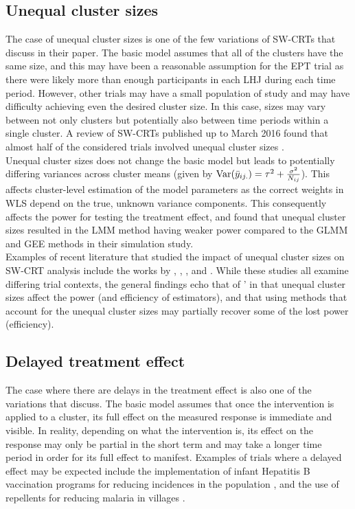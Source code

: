 \documentclass[10pt]{article}
\begin{document}
\subsection{Unequal cluster sizes}

The case of unequal cluster sizes is one of the few variations of SW-CRTs that \citeauthor{Hussey:2007} discuss in their paper. The basic model assumes that all of the clusters have the same size, and this may have been a reasonable assumption for the EPT trial as there were likely more than enough participants in each LHJ during each time period. However, other trials may have a small population of study and may have difficulty achieving even the desired cluster size. In this case, sizes may vary between not only clusters but potentially also between time periods within a single cluster. A review of SW-CRTs published up to March 2016 found that almost half of the considered trials involved unequal cluster sizes \parencite{Kristunas:2017}.
\\

Unequal cluster sizes does not change the basic model but leads to potentially differing variances across cluster means (given by $\mathrm{Var}(\bar{y}_{ij.})=\tau^2+\frac{\sigma^2}{N_{ij}}$). This affects cluster-level estimation of the model parameters as the correct weights in WLS depend on the true, unknown variance components. This consequently affects the power for testing the treatment effect, and \textcite{Hussey:2007} found that unequal cluster sizes resulted in the LMM method having weaker power compared to the GLMM and GEE methods in their simulation study.
\\

Examples of recent literature that studied the impact of unequal cluster sizes on SW-CRT analysis include the works by \textcite{Martin:2019}, \textcite{Ouyang:2020}, \textcite{Kasza:2021}, and \textcite{Tian:2021}. While these studies all examine differing trial contexts, the general findings echo that of \citeauthor{Hussey:2007}' in that unequal cluster sizes affect the power (and efficiency of estimators), and that using methods that account for the unequal cluster sizes may partially recover some of the lost power (efficiency).

\subsection{Delayed treatment effect}

The case where there are delays in the treatment effect is also one of the variations that \citeauthor{Hussey:2007} discuss. The basic model assumes that once the intervention is applied to a cluster, its full effect on the measured response is immediate and visible. In reality, depending on what the intervention is, its effect on the response may only be partial in the short term and may take a longer time period in order for its full effect to manifest. Examples of trials where a delayed effect may be expected include the implementation of infant Hepatitis B vaccination programs for reducing incidences in the population \parencite{Hughes:2015}, and the use of repellents for reducing malaria in villages \parencite{Agius:2020}.
\\
\end{document}
